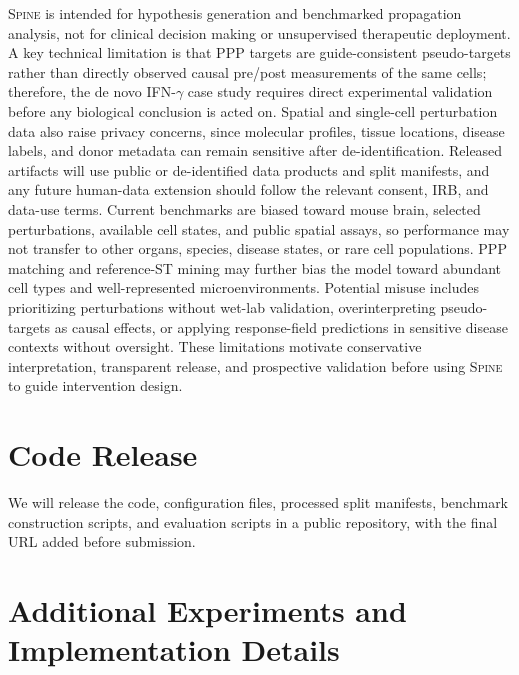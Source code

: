 \documentclass[sigconf,review,balance=false]{acmart}
\newcommand{\methodname}{\textsc{Spine}\xspace}
\begin{document}
\methodname{} is intended for hypothesis generation and benchmarked propagation analysis, not for clinical decision making or unsupervised therapeutic deployment. A key technical limitation is that PPP targets are guide-consistent pseudo-targets rather than directly observed causal pre/post measurements of the same cells; therefore, the de novo IFN-$\gamma$ case study requires direct experimental validation before any biological conclusion is acted on. Spatial and single-cell perturbation data also raise privacy concerns, since molecular profiles, tissue locations, disease labels, and donor metadata can remain sensitive after de-identification. Released artifacts will use public or de-identified data products and split manifests, and any future human-data extension should follow the relevant consent, IRB, and data-use terms. Current benchmarks are biased toward mouse brain, selected perturbations, available cell states, and public spatial assays, so performance may not transfer to other organs, species, disease states, or rare cell populations. PPP matching and reference-ST mining may further bias the model toward abundant cell types and well-represented microenvironments. Potential misuse includes prioritizing perturbations without wet-lab validation, overinterpreting pseudo-targets as causal effects, or applying response-field predictions in sensitive disease contexts without oversight. These limitations motivate conservative interpretation, transparent release, and prospective validation before using \methodname{} to guide intervention design.
\section{Code Release}
\label{sec:code_release}
We will release the code, configuration files, processed split manifests, benchmark construction scripts, and evaluation scripts in a public repository, with the final URL added before submission.


\clearpage
\appendix
\setcounter{table}{0}
\setcounter{figure}{0}
\renewcommand{\thetable}{S\arabic{table}}
\renewcommand{\thefigure}{S\arabic{figure}}
\renewcommand{\theHtable}{appendix.table.\arabic{table}}
\renewcommand{\theHfigure}{appendix.figure.\arabic{figure}}

\section{Additional Experiments and Implementation Details}
\label{app:additional_experiments}
\end{document}
